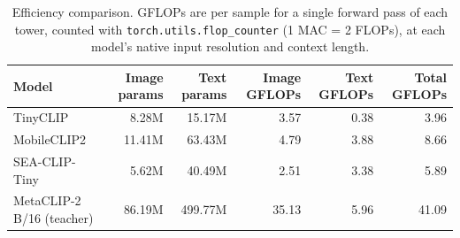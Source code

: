 \begin{table}[h!]
\centering
\begin{tabular}{l r r r r r}
\toprule
\textbf{Model} & \textbf{Image params} & \textbf{Text params}
  & \textbf{Image GFLOPs} & \textbf{Text GFLOPs} & \textbf{Total GFLOPs} \\
\midrule
TinyCLIP & 8.28M & 15.17M & 3.57 & 0.38 & 3.96 \\
MobileCLIP2 & 11.41M & 63.43M & 4.79 & 3.88 & 8.66 \\
SEA-CLIP-Tiny & 5.62M & 40.49M & 2.51 & 3.38 & 5.89 \\
MetaCLIP-2 B/16 (teacher) & 86.19M & 499.77M & 35.13 & 5.96 & 41.09 \\
\bottomrule
\end{tabular}
\caption{Efficiency comparison. GFLOPs are per sample for a single forward pass of each tower, counted with \texttt{torch.utils.flop\_counter} (1 MAC = 2 FLOPs), at each model's native input resolution and context length.}
\label{tab:efficiency}
\end{table}
